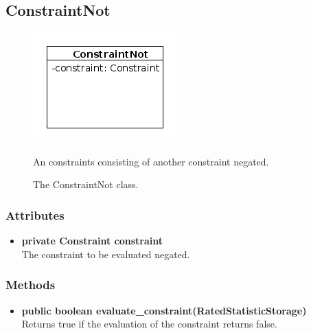 \subsection{ConstraintNot}
\begin{figure}[htbp]
	\begin{minipage}[t]{8cm}
		\vspace{0pt}
		\centering
		\includegraphics[scale=0.6]{./diagram_pictures/reactor/ConstraintNot.png}
		\caption{The ConstraintNot class.}
	\end{minipage}
	\hfill
	\begin{minipage}[t]{8cm}
		\vspace{10pt}
			An constraints consisting of another constraint negated.
	\end{minipage}
\end{figure}  

\subsubsection{Attributes}
\begin{itemize}
	\item \textbf{ private Constraint constraint }\\
	The constraint to be evaluated negated.
\end{itemize}
\subsubsection{Methods}
\begin{itemize}
	\item \textbf{ public boolean evaluate\_constraint(RatedStatisticStorage) }\\
	Returns true if the evaluation of the constraint returns false.
\end{itemize}


\newpage
